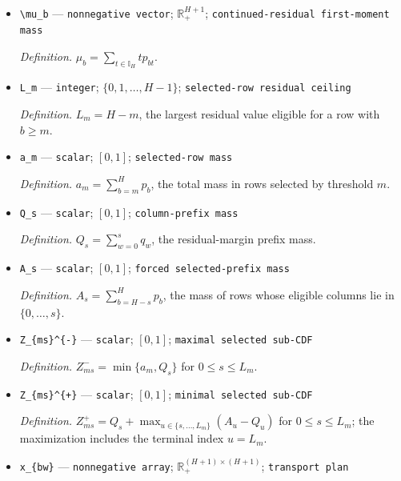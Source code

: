 \documentclass{article}
\begin{document}
\begin{itemize}
  \par\smallskip\noindent\emph{Definition.} \(q_w=\mathsf P(\min\{Y_K^0-Y_k^0,H\}=w\mid S_k^0=1)\).
  \item \texttt{\textbackslash{}\allowbreak{}mu\_\allowbreak{}b} --- \texttt{nonnegative vector}; \(\mathbb R_+^{H+1}\); \texttt{continued-\allowbreak{}residual first-\allowbreak{}moment mass}
  \par\smallskip\noindent\emph{Definition.} \(\mu_b=\sum_{t\in\mathbb I_H}t p_{bt}\).
  \item \texttt{L\_\allowbreak{}m} --- \texttt{integer}; \(\{0,1,\ldots,H-1\}\); \texttt{selected-\allowbreak{}row residual ceiling}
  \par\smallskip\noindent\emph{Definition.} \(L_m=H-m\), the largest residual value eligible for a row with \(b\ge m\).
  \item \texttt{a\_\allowbreak{}m} --- \texttt{scalar}; \([0,1]\); \texttt{selected-\allowbreak{}row mass}
  \par\smallskip\noindent\emph{Definition.} \(a_m=\sum_{b=m}^{H}p_b\), the total mass in rows selected by threshold \(m\).
  \item \texttt{Q\_\allowbreak{}s} --- \texttt{scalar}; \([0,1]\); \texttt{column-\allowbreak{}prefix mass}
  \par\smallskip\noindent\emph{Definition.} \(Q_s=\sum_{w=0}^{s}q_w\), the residual-margin prefix mass.
  \item \texttt{A\_\allowbreak{}s} --- \texttt{scalar}; \([0,1]\); \texttt{forced selected-\allowbreak{}prefix mass}
  \par\smallskip\noindent\emph{Definition.} \(A_s=\sum_{b=H-s}^{H}p_b\), the mass of rows whose eligible columns lie in \(\{0,\ldots,s\}\).
  \item \texttt{Z\_\allowbreak{}\{ms\}\allowbreak{}\textasciicircum{}\{-\allowbreak{}\}\allowbreak{}} --- \texttt{scalar}; \([0,1]\); \texttt{maximal selected sub-\allowbreak{}CDF}
  \par\smallskip\noindent\emph{Definition.} \(Z_{ms}^{-}=\min\{a_m,Q_s\}\) for \(0\le s\le L_m\).
  \item \texttt{Z\_\allowbreak{}\{ms\}\allowbreak{}\textasciicircum{}\{+\allowbreak{}\}\allowbreak{}} --- \texttt{scalar}; \([0,1]\); \texttt{minimal selected sub-\allowbreak{}CDF}
  \par\smallskip\noindent\emph{Definition.} \(Z_{ms}^{+}=Q_s+\max_{u\in\{s,\ldots,L_m\}}(A_u-Q_u)\) for \(0\le s\le L_m\); the maximization includes the terminal index \(u=L_m\).
  \item \texttt{x\_\allowbreak{}\{bw\}\allowbreak{}} --- \texttt{nonnegative array}; \(\mathbb R_+^{(H+1)\times(H+1)}\); \texttt{transport plan}

\end{itemize}
\end{document}
